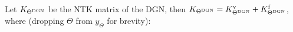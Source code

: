 \begin{proposition}\label{prop:ntks} Let $K_{\Theta^{\text{DGN}}}$ be the NTK matrix of the DGN, then $K_{\Theta^{\text{DGN}}}=K^{\text{v}}_{\Theta^{\text{DGN}}}+K^{\text{f}}_{\Theta^{\text{DGN}}}$, where (dropping $\Theta$ from $\hat{y}_{\Theta}$ for brevity):
\end{proposition}
